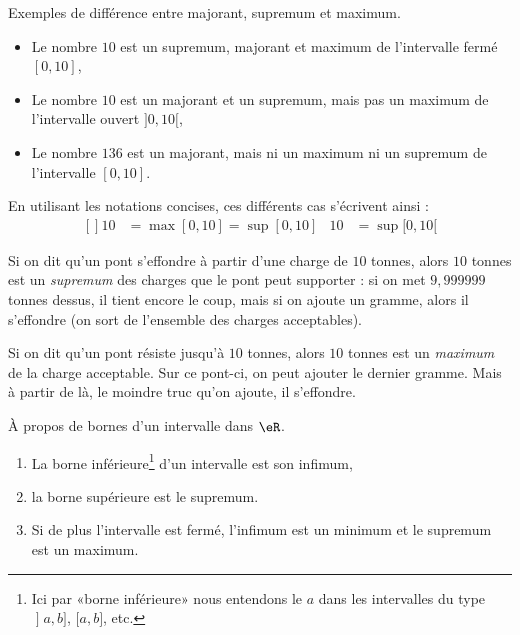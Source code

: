 \begin{example}
	Exemples de différence entre majorant, supremum et maximum.
	\begin{itemize}
		\item Le nombre \( 10\) est un supremum, majorant et maximum de l'intervalle fermé \( [0,10]\),
		\item Le nombre \( 10\) est un majorant et un supremum, mais pas un maximum de l'intervalle ouvert \( ]0,10[\),
		\item Le nombre \( 136\) est un majorant, mais ni un maximum ni un supremum de l'intervalle \( [0,10]\).
	\end{itemize}
\end{example}

En utilisant les notations concises, ces différents cas s'écrivent ainsi :
\begin{equation}
	\begin{aligned}[]
		10 & =\max[0,10]=\sup[0,10] & 10 & =\sup[0,10[
	\end{aligned}
\end{equation}


\begin{example}
	Si on dit qu'un pont s'effondre à partir d'une charge de \( 10\) tonnes, alors \( 10\) tonnes est un \emph{supremum} des charges que le pont peut supporter : si on met \( 9,999999\) tonnes dessus, il tient encore le coup, mais si on ajoute un gramme, alors il s'effondre (on sort de l'ensemble des charges acceptables).
\end{example}

\begin{example}
	Si on dit qu'un pont résiste jusqu'à \( 10\) tonnes, alors \( 10\) tonnes est un \emph{maximum} de la charge acceptable. Sur ce pont-ci, on peut ajouter le dernier gramme. Mais à partir de là, le moindre truc qu'on ajoute, il s'effondre.
\end{example}

\begin{lemma}       \label{LEMooWCUXooFqTwDK}
	À propos de bornes d'un intervalle dans \( \eR\).
	\begin{enumerate}
		\item
		      La borne inférieure\footnote{Ici par «borne inférieure» nous entendons le \( a\) dans les intervalles du type \( \mathopen] a , b \mathclose] \), \( \mathopen[ a , b \mathclose]\), etc.} d'un intervalle est son infimum,
		\item
		      la borne supérieure est le supremum.
		\item
		      Si de plus l'intervalle est fermé, l'infimum est un minimum et le supremum est un maximum.
	\end{enumerate}
\end{lemma}


